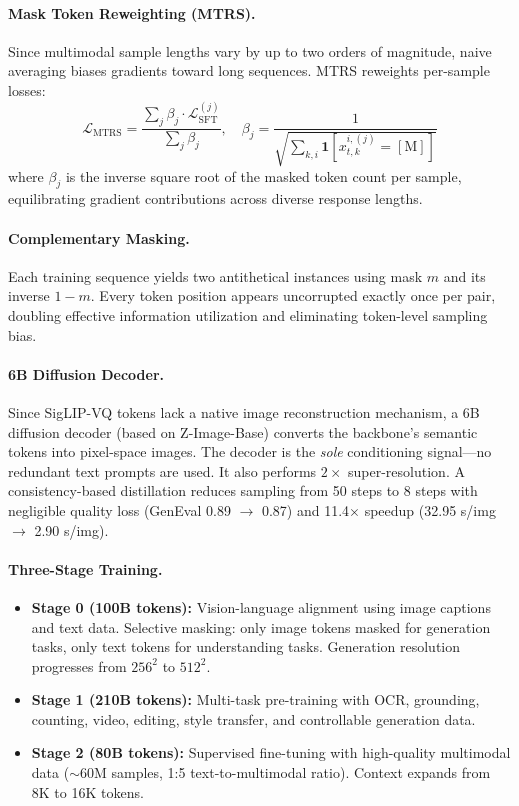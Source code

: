 \documentclass[11pt]{article}
\begin{document}
\paragraph{Mask Token Reweighting (MTRS).}
Since multimodal sample lengths vary by up to two orders of magnitude, naive averaging biases gradients toward long sequences. MTRS reweights per-sample losses:
\begin{equation}
    \mathcal{L}_{\mathrm{MTRS}} = \frac{\sum_j \beta_j \cdot \mathcal{L}_{\mathrm{SFT}}^{(j)}}{\sum_j \beta_j}, \quad \beta_j = \frac{1}{\sqrt{\sum_{k,i}\mathbf{1}[x_{t,k}^{i,(j)}=\mathrm{[M]}]}}
\end{equation}
where $\beta_j$ is the inverse square root of the masked token count per sample, equilibrating gradient contributions across diverse response lengths.

\paragraph{Complementary Masking.}
Each training sequence yields two antithetical instances using mask $m$ and its inverse $1-m$. Every token position appears uncorrupted exactly once per pair, doubling effective information utilization and eliminating token-level sampling bias.

\paragraph{6B Diffusion Decoder.}
Since SigLIP-VQ tokens lack a native image reconstruction mechanism, a 6B diffusion decoder (based on Z-Image-Base) converts the backbone's semantic tokens into pixel-space images. The decoder is the \emph{sole} conditioning signal---no redundant text prompts are used. It also performs $2\times$ super-resolution. A consistency-based distillation reduces sampling from 50 steps to 8 steps with negligible quality loss (GenEval 0.89 $\to$ 0.87) and 11.4$\times$ speedup (32.95 s/img $\to$ 2.90 s/img).

\paragraph{Three-Stage Training.}
\begin{itemize}
    \item \textbf{Stage 0 (100B tokens):} Vision-language alignment using image captions and text data. Selective masking: only image tokens masked for generation tasks, only text tokens for understanding tasks. Generation resolution progresses from $256^2$ to $512^2$.
    \item \textbf{Stage 1 (210B tokens):} Multi-task pre-training with OCR, grounding, counting, video, editing, style transfer, and controllable generation data.
    \item \textbf{Stage 2 (80B tokens):} Supervised fine-tuning with high-quality multimodal data ($\sim$60M samples, 1:5 text-to-multimodal ratio). Context expands from 8K to 16K tokens.
\end{itemize}
\end{document}
